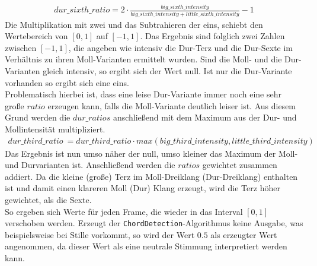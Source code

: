 \documentclass[11pt,a4paper]{article}
\begin{document}
\begin{align}
dur\_sixth\_ratio = 2 \cdot \frac{big\_sixth\_intensity}{big\_sixth\_intensity + little\_sixth\_intensity}- 1
\end{align}
\noindent
Die Multiplikation mit zwei und das Subtrahieren der eins, schiebt den Wertebereich von $[0, 1]$ auf $[-1, 1]$. Das Ergebnis sind folglich zwei Zahlen zwischen $[-1, 1]$, die angeben wie intensiv die Dur-Terz und die Dur-Sexte im Verhältnis zu ihren Moll-Varianten ermittelt wurden. Sind die Moll- und die Dur-Varianten gleich intensiv, so ergibt sich der Wert null. Ist nur die Dur-Variante vorhanden so ergibt sich eine eins.\\
Problematisch hierbei ist, dass eine leise Dur-Variante immer noch eine sehr große $ratio$ erzeugen kann, falls die Moll-Variante deutlich leiser ist. Aus diesem Grund werden die $dur\_ratios$ anschließend mit dem Maximum aus der Dur- und Mollintensität multipliziert.
\begin{align}
dur\_third\_ratio\ = dur\_third\_ratio \cdot max(big\_third\_intensity, little\_third\_intensity)
\end{align}
\noindent
Das Ergebnis ist nun umso näher der null, umso kleiner das Maximum der Moll- und Durvarianten ist. Anschließend werden die $ratios$ gewichtet zusammen addiert. Da die kleine (große) Terz im Moll-Dreiklang (Dur-Dreiklang) enthalten ist und damit einen klareren Moll (Dur) Klang erzeugt, wird die Terz höher gewichtet, als die Sexte.\\
So ergeben sich Werte für jeden Frame, die wieder in das Interval $[0, 1]$ verschoben werden. Erzeugt der \lstinline!ChordDetection!-Algorithmus keine Ausgabe, was beispielsweise bei Stille vorkommt, so wird der Wert $0.5$ als erzeugter Wert angenommen, da dieser Wert als eine neutrale Stimmung interpretiert werden kann.

\newpage
\end{document}
